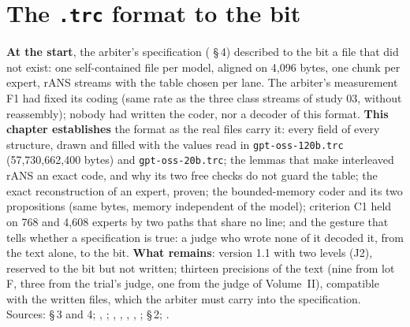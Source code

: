 


\chapter{The \texttt{.trc} format to the bit}\label{t2fmt:ch}

\begin{origine}
\textbf{At the start}, the arbiter's specification ( §\,4) described to the bit a file that did not exist: one self-contained file per model, aligned on 4{,}096 bytes, one chunk per expert, rANS streams with the table chosen per lane. The arbiter's measurement F1 had fixed its coding (same rate as the three class streams of study 03, without reassembly); nobody had written the coder, nor a decoder of this format.
\textbf{This chapter establishes} the format as the real files carry it: every field of every structure, drawn and filled with the values read in \texttt{gpt-oss-120b.trc} (57{,}730{,}662{,}400 bytes) and \texttt{gpt-oss-20b.trc}; the lemmas that make interleaved rANS an exact code, and why its two free checks do not guard the table; the exact reconstruction of an expert, proven; the bounded-memory coder and its two propositions (same bytes, memory independent of the model); criterion C1 held on 768 and 4{,}608 experts by two paths that share no line; and the gesture that tells whether a specification is true: a judge who wrote none of it decoded it, from the text alone, to the bit.
\textbf{What remains}: version 1.1 with two levels (J2), reserved to the bit but not written; thirteen precisions of the text (nine from lot F, three from the trial's judge, one from the judge of Volume~II), compatible with the written files, which the arbiter must carry into the specification.
Sources:  §\,3 and 4; , ; , , , , ;  §\,2; .
\end{origine}

